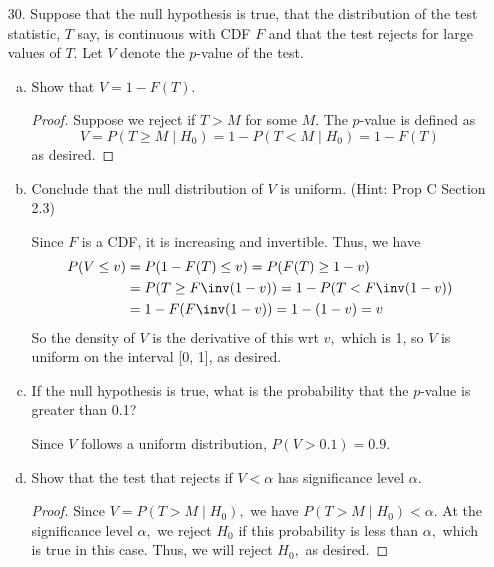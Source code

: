 \documentclass{article}
\begin{document}
\begin{itemize}
	\item[30.] Suppose that the null hypothesis is true, that the distribution of the test statistic, $T$ say, is continuous with CDF $F$ and that the test rejects for large values of $T.$ Let $V$ denote the $p$-value of the test.
		\begin{enumerate}[a.]
			\item Show that $V=1-F(T).$
				\begin{proof}
					Suppose we reject if $T>M$ for some $M.$ The $p$-value is defined as \[V=P(T\ge M\mid H_0)=1-P(T<M\mid H_0) = 1-F(T)\] as desired.
					
				\end{proof}

				\newpage
			\item Conclude that the null distribution of $V$ is uniform. (Hint: Prop C Section 2.3)
				\begin{soln}
					Since $F$ is a CDF, it is increasing and invertible. Thus, we have 
					\begin{align*}
						P(V\le v) &= P(1-F(T)\le v) = P(F(T)\ge 1-v) \\
						&= P(T\ge F\inv(1-v)) = 1-P(T<F\inv(1-v)) \\
						&= 1-F(F\inv(1-v)) = 1-(1-v) = v
					\end{align*}
					So the density of $V$ is the derivative of this wrt $v,$ which is 1, so $V$ is uniform on the interval [0, 1], as desired.

				\end{soln}

			\item If the null hypothesis is true, what is the probability that the $p$-value is greater than 0.1?
				\begin{answer*}
					Since $V$ follows a uniform distribution, $P(V>0.1)=0.9.$
				\end{answer*}

			\item Show that the test that rejects if $V<\alpha$ has significance level $\alpha.$
				\begin{proof}
					Since $V=P(T>M\mid H_0),$ we have $P(T>M\mid H_0)<\alpha.$ At the significance level $\alpha,$ we reject $H_0$ if this probability is less than $\alpha,$ which is true in this case. Thus, we will reject $H_0,$ as desired.
					
				\end{proof}
				
		\end{enumerate}
		
\end{itemize}
\end{document}
